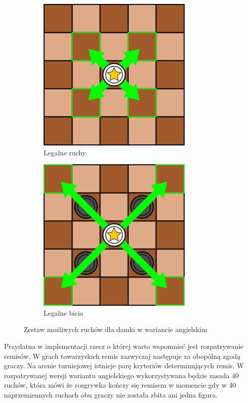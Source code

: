 \begin{figure}
\centering
\begin{subfigure}{.5\textwidth}
  \centering
  \includegraphics[scale=.6]{graphics/warcaby_ruchyDamkaZwykle.png}
  \caption{Legalne ruchy}
  \label{fig:sub11}
\end{subfigure}%
\begin{subfigure}{.5\textwidth}
  \centering
  \includegraphics[scale=.6]{graphics/warcaby_ruchyDamkaBicia.png}
  \caption{Legalne bicia}
  \label{fig:sub22}
\end{subfigure}
\caption{Zestaw możliwych ruchów dla damki w wariancie angielskim}
\label{fig:test}
\end{figure}

\FloatBarrier

Przydatna w implementacji rzecz o której warto wspomnieć jest rozpatrywanie remisów. W grach towarzyskich remis zazwyczaj następuje za obopólną zgodą graczy. Na arenie turniejowej istnieje parę kryteriów determinujących remis. W rozpatrywanej wersji wariantu angielskiego wykorzystywana będzie zasada 40 ruchów, która mówi że rozgrywka kończy się remisem w momencie gdy w 40 naprzemiennych ruchach obu graczy nie została zbita ani jedna figura.

